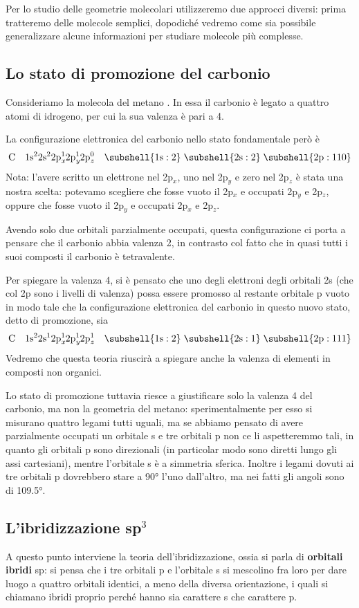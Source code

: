 Per lo studio delle geometrie molecolari utilizzeremo due approcci diversi: prima tratteremo delle molecole semplici, dopodiché vedremo come sia possibile generalizzare alcune informazioni per studiare molecole più complesse.
\subsection{Lo stato di promozione del carbonio}
Consideriamo la molecola del metano . In essa il carbonio è legato a quattro atomi di idrogeno, per cui la sua valenza è pari a 4.

La configurazione elettronica del carbonio nello stato fondamentale però è
$$\rm C \quad 1s^22s^22p_{\textit{x}}^12p_{\textit{y}}^12p_{\textit{z}}^0 \quad \subshell{1s:2} \; \subshell{2s:2} \; \subshell{2p:110}$$
Nota: l'avere scritto  un elettrone nel 2p$_x$, uno nel 2p$_y$ e zero nel 2p$_z$ è stata una nostra scelta: potevamo scegliere che fosse vuoto il 2p$_x$ e occupati 2p$_y$ e 2p$_z$, oppure che fosse vuoto il 2p$_y$ e occupati 2p$_x$ e 2p$_z$.

Avendo solo due orbitali parzialmente occupati, questa configurazione ci porta a pensare che il carbonio abbia valenza 2, in contrasto col fatto che in quasi tutti i suoi composti il carbonio è tetravalente.

Per spiegare la valenza 4, si è pensato che uno degli elettroni degli orbitali 2s (che col 2p sono i livelli di valenza) possa essere promosso al restante orbitale p vuoto in modo tale che la configurazione elettronica del carbonio in questo nuovo stato, detto di promozione, sia
$$\rm C \quad 1s^22s^12p_{\textit{x}}^12p_{\textit{y}}^12p_{\textit{z}}^1 \quad \subshell{1s:2} \; \subshell{2s:1} \; \subshell{2p:111}$$
Vedremo che questa teoria riuscirà a spiegare anche la valenza di elementi in composti non organici.

Lo stato di promozione tuttavia riesce a giustificare solo la valenza 4 del carbonio, ma non la geometria del metano: sperimentalmente per esso si misurano quattro legami tutti uguali, ma se abbiamo pensato di avere parzialmente occupati un orbitale s e tre orbitali p non ce li aspetteremmo tali, in quanto gli orbitali p sono direzionali (in particolar modo sono diretti lungo gli assi cartesiani), mentre l'orbitale s è a simmetria sferica. Inoltre i legami dovuti ai tre orbitali p dovrebbero stare a 90° l'uno dall'altro, ma nei fatti gli angoli sono di 109.5°.
\subsection{L'ibridizzazione sp$^3$}
A questo punto interviene la teoria dell'ibridizzazione, ossia si parla di \textbf{orbitali ibridi} sp: si pensa che i tre orbitali p e l'orbitale s si mescolino fra loro per dare luogo a quattro orbitali identici, a meno della diversa orientazione, i quali si chiamano ibridi proprio perché hanno sia carattere s che carattere p.


